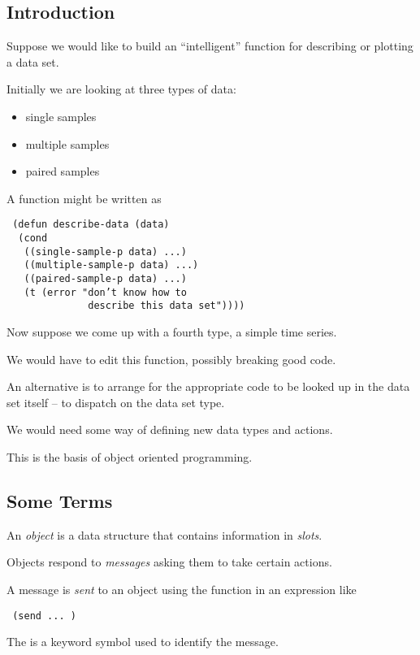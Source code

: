 \begin{slide}{}
\section{Introduction}
Suppose we would like to build an ``intelligent'' function for describing
or plotting a data set.

Initially we are looking at three types of data:
\begin{itemize}
\item single samples
\item multiple samples
\item paired samples
\end{itemize}
A  function might be written as
\begin{flushleft}\Large\tt
(defun describe-data (data)\\
~~(cond\\
~~~((single-sample-p data) ...)\\
~~~((multiple-sample-p data) ...)\\
~~~((paired-sample-p data) ...)\\
~~~(t (error "don't know how to \~\\
~~~~~~~~~~~~~~describe this data set"))))
\end{flushleft}
\end{slide}

\begin{slide}{}
Now suppose we come up with a fourth type, a simple time series.

We would have to edit this function, possibly breaking good code. 

An alternative is to arrange for the appropriate code to be looked up
in the data set itself -- to dispatch on the data set type.

We would need some way of defining new data types and actions.

This is the basis of object oriented programming.
\end{slide}

\begin{slide}{}
\subsection{Some Terms}
An {\em object}\/ is a data structure that contains information in
{\em slots}.

Objects respond to {\em messages}\/ asking them to take certain
actions.

A message is {\em sent} to an object using the function 
in an expression like
\begin{flushleft}\Large\tt
(send    ... )
\end{flushleft}
The  is a keyword symbol used to identify the message.
\end{slide}


